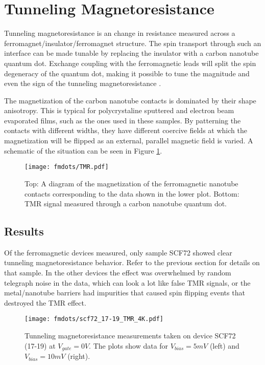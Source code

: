 \section{Tunneling Magnetoresistance}
\label{sec:TMR}

Tunneling magnetoresistance is an change in resistance measured across a ferromagnet/insulator/ferromagnet structure. The spin transport through such an interface can be made tunable by replacing the insulator with a carbon nanotube quantum dot. Exchange coupling with the ferromagnetic leads will split the spin degeneracy of the quantum dot, making it possible to tune the magnitude and even the sign of the tunneling magnetoresistance \cite{Tsymbal2003, Sahoo2005, Thamankar2006}.

The magnetization of the carbon nanotube contacts is dominated by their shape anisotropy. This is typical for polycrystaline sputtered and electron beam evaporated films, such as the ones used in these samples. By patterning the contacts with different widths, they have different coercive fields at which the magnetization will be flipped as an external, parallel magnetic field is varied. A schematic of the situation can be seen in Figure \ref{fig:spin_valve}.

\begin{figure}
    \centering
    \texttt{[image: fmdots/TMR.pdf]}
    \caption{Top: A diagram of the magnetization of the ferromagnetic nanotube contacts corresponding to the data shown in the lower plot. Bottom: TMR signal measured through a carbon nanotube quantum dot.}
    \label{fig:spin_valve}
\end{figure}

\subsection{Results}

Of the ferromagnetic devices measured, only sample SCF72 showed clear tunneling magnetoresistance behavior. Refer to the previous section for details on that sample. In the other devices the effect was overwhelmed by random telegraph noise in the data, which can look a lot like false TMR signals, or the metal/nanotube barriers had impurities that caused spin flipping events that destroyed the TMR effect.

\begin{figure}
    \centering
    \texttt{[image: fmdots/scf72\_17-19\_TMR\_4K.pdf]}
    \caption{Tunneling magnetoresistance measurements taken on device SCF72 (17-19) at $V_{gate} = 0V$. The plots show data for $V_{bias} = 5mV$ (left) and $V_{bias} = 10mV$ (right).}
    \label{fig:TMR_real}
\end{figure}

